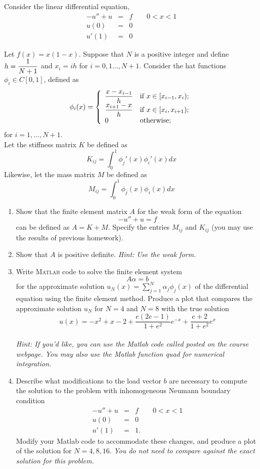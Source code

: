 Consider the linear differential equation,
\begin{eqnarray*}
-u'' + u &=&f \qquad 0<x<1\\
		u(0)&=&0 \\
		u'(1)&=&0
\end{eqnarray*}

Let $f(x) = x(1-x)$. Suppose that $N$ is a positive integer and define $\displaystyle{h = {1\over N+1}}$ and $x_i = ih$ for $i = 0,1\ldots, N+1$. Consider the hat functions $\phi_i\in C[0,1]$, defined as
\[
\phi_i(x) = \left\{
\begin{array}{ll}
\displaystyle{{x-x_{i-1}\over h}} & \mbox{if }x\in [x_{i-1}, x_i);\\
\displaystyle{{x_{i+1}-x\over h}} & \mbox{if }x\in [x_i, x_{i+1});\\
0 & \mbox{otherwise};
\end{array}\right.
\]
for $i=1,\ldots, N+1$. 
\\
Let the stiffness matrix $K$ be defined as
\[
K_{ij} = \int_0^1 \phi_j'(x) \phi_i'(x) dx  
\]
Likewise, let the mass matrix $M$ be defined as 
\[
M_{ij} = \int_0^1 \phi_j(x) \phi_i(x) dx  
\]
\begin{enumerate}
\item  Show that the finite element matrix $A$ for the weak form of the equation
\[
-u'' + u = f
\]
can be defined as $A = K +M$.  Specify the entries $M_{ij}$ and $K_{ij}$ (you may use the results of previous homework).  
\item Show that $A$ is positive definite. \emph{Hint: Use the weak form.}
\item Write \textsc{Matlab} code to solve the finite element system
\[
A\alpha = b
\]
for the approximate solution $u_N(x) = \sum_{j=1}^N \alpha_j \phi_j(x)$ of the differential equation using the finite element method.  Produce a plot that compares the approximate solution $u_N$ for $N = 4$ and $N = 8$ with the true solution
\[
u(x) = -x^2 + x - 2 + \frac{e(2e-1)}{1 + e^2} e^{-x} + \frac{e + 2}{1 + e^2} e^x
\]
\\
\emph{Hint: If you'd like, you can use the Matlab code called posted on the course webpage.
You may also use the Matlab function quad for numerical integration.}

\item Describe what modifications to the load vector $b$ are necessary to compute the solution to the problem with inhomogeneous Neumann boundary condition
\begin{eqnarray*}
-u'' + u &=&f \qquad 0<x<1\\
u(0)&=&0 \\
u'(1)&=&1.
\end{eqnarray*}
Modify your Matlab code to accommodate these changes, and produce a plot of the solution for $N = 4, 8, 16$.  \emph{You do not need to compare against the exact solution for this problem.}
\end{enumerate}

